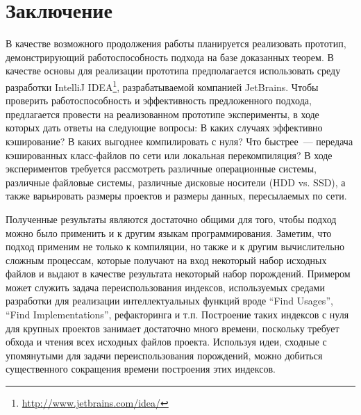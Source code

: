\section*{Заключение}
В качестве возможного продолжения работы планируется реализовать прототип, демонстрирующий работоспособность подхода на базе доказанных теорем. В качестве основы для реализации прототипа предполагается использовать среду разработки IntelliJ IDEA\footnote{\url{http://www.jetbrains.com/idea/}}, разрабатываемой компанией JetBrains. Чтобы проверить работоспособность и эффективность предложенного подхода, предлагается провести на реализованном прототипе эксперименты, в ходе которых дать ответы на следующие вопросы: В каких случаях эффективно кэширование? В каких выгоднее компилировать с нуля? Что быстрее~--- передача кэшированных класс-файлов по сети или локальная перекомпиляция? В ходе экспериментов требуется рассмотреть различные операционные системы, различные файловые системы, различные дисковые носители (HDD vs. SSD), а также варьировать размеры проектов и размеры данных, пересылаемых по сети.

Полученные результаты являются достаточно общими для того, чтобы подход можно было применить и к другим языкам программирования. Заметим, что подход применим не только к компиляции, но также и к другим вычислительно сложным процессам, которые получают на вход некоторый набор исходных файлов и выдают в качестве результата некоторый набор порождений. Примером может служить задача переиспользования индексов, используемых средами разработки для реализации интеллектуальных функций вроде ``Find Usages'', ``Find Implementations'', рефакторинга и т.п. Построение таких индексов с нуля для крупных проектов занимает достаточно много времени, поскольку требует обхода и чтения всех исходных файлов проекта. Используя идеи, сходные с упомянутыми для задачи переиспользования порождений, можно добиться существенного сокращения времени построения этих индексов.